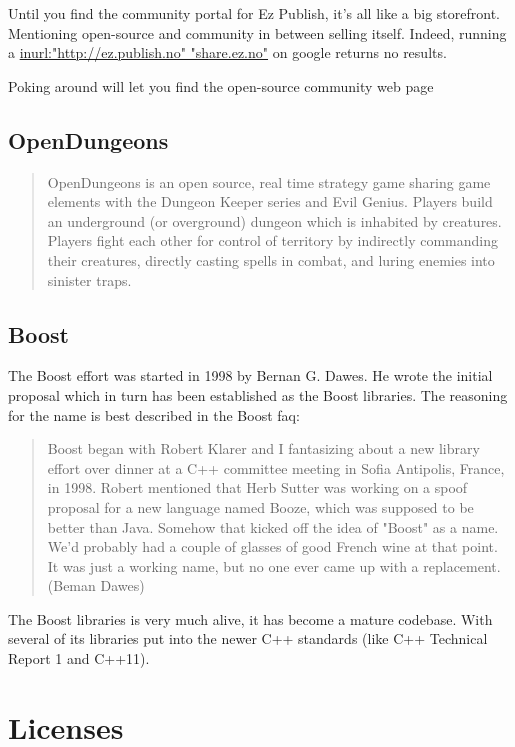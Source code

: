 \documentclass{report} %
\begin{document}
Until you find the community portal for Ez Publish, it's all like a big storefront. Mentioning open-source and community in between selling itself. Indeed, running a \url{inurl:"http://ez.publish.no" "share.ez.no"} on google returns no results.

Poking around will let you find the open-source community web page\cite{ezcomweb}

\subsection{OpenDungeons} %
\begin{quotation}
OpenDungeons is an open source, real time strategy game sharing game elements with the Dungeon Keeper series and Evil Genius. Players build an underground (or overground) dungeon which is inhabited by creatures. Players fight each other for control of territory by indirectly commanding their creatures, directly casting spells in combat, and luring enemies into sinister traps.\cite{odwebabout}
\end{quotation}

\subsection{Boost}
The Boost effort was started in 1998 by Bernan G. Dawes. He wrote the initial proposal\cite{boostproposal} which in turn has been established as the Boost libraries. The reasoning for the name is best described in the Boost faq\cite{boostfaq}:
\begin{quote}
Boost began with Robert Klarer and I fantasizing about a new library effort over dinner at a C++ committee meeting in Sofia Antipolis, France, in 1998. Robert mentioned that Herb Sutter was working on a spoof proposal for a new language named Booze, which was supposed to be better than Java. Somehow that kicked off the idea of "Boost" as a name. We'd probably had a couple of glasses of good French wine at that point. It was just a working name, but no one ever came up with a replacement. (Beman Dawes)
\end{quote}
The Boost libraries is very much alive, it has become a mature codebase. With several of its libraries put into the newer C++ standards (like C++ Technical Report 1 and C++11).

\section{Licenses}
\end{document}
